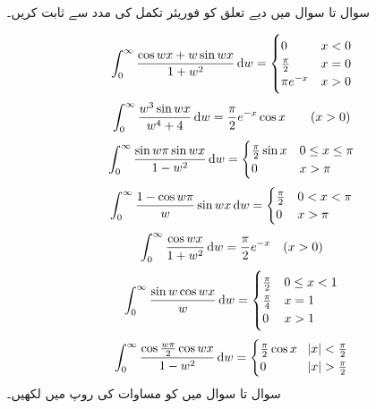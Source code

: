 سوال  تا سوال  میں دیے تعلق کو فوریئر تکمل کی مدد سے ثابت کریں۔

\begin{align*}
\int_0^{\infty} \frac{\cos wx+w\sin wx}{1+w^2}\dif w=
\begin{cases}
0&x<0\\
\frac{\pi}{2}&x=0\\
\pi e^{-x} &x>0
\end{cases}
\end{align*}
\begin{align*}
\int_0^{\infty} \frac{w^3\sin wx}{w^4+4}\dif w=\frac{\pi}{2}e^{-x}\cos x\quad \quad (x>0)
\end{align*}
\begin{align*}
\int_0^{\infty} \frac{\sin w\pi\sin wx}{1-w^2}\dif w=
\begin{cases}
\frac{\pi}{2}\sin x&0\le x\le \pi\\
0&x>\pi
\end{cases}
\end{align*}
\begin{align*}
\int_0^{\infty} \frac{1-\cos w\pi}{w}\sin wx\dif w=
\begin{cases}
\frac{\pi}{2}&0< x< \pi\\
0&x>\pi
\end{cases}
\end{align*}
\begin{align*}
\int_0^{\infty} \frac{\cos wx}{1+w^2}\dif w=\frac{\pi}{2}e^{-x}\quad (x>0)
\end{align*}
\begin{align*}
\int_0^{\infty} \frac{\sin w\cos wx}{w}\dif w=
\begin{cases}
\frac{\pi}{2}&0\le  x< 1\\
\frac{\pi}{4}&x=1\\
0&x>1
\end{cases}
\end{align*}
\begin{align*}
\int_0^{\infty} \frac{\cos\frac{w\pi}{2}\cos wx}{1-w^2}\dif w=
\begin{cases}
\frac{\pi}{2}\cos x&\abs{x}<\frac{\pi}{2}\\
0&\abs{x}>\frac{\pi}{2}
\end{cases}
\end{align*}
سوال  تا سوال  میں  کو مساوات  کی روپ میں لکھیں۔

